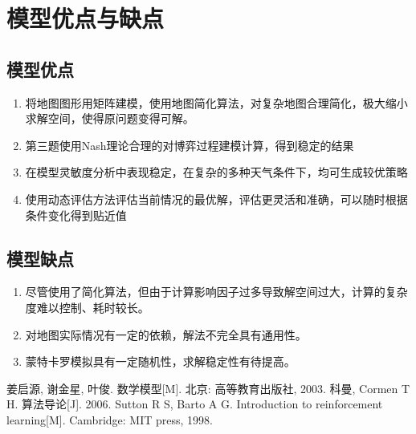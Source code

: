 \documentclass[withoutpre]{cumcmthesis} %
\begin{document}
\section{模型优点与缺点}
\subsection{模型优点}
\begin{enumerate}
    \item 将地图图形用矩阵建模，使用地图简化算法，对复杂地图合理简化，极大缩小求解空间，使得原问题变得可解。
    \item 第三题使用Nash理论合理的对博弈过程建模计算，得到稳定的结果
    \item 在模型灵敏度分析中表现稳定，在复杂的多种天气条件下，均可生成较优策略
    \item 使用动态评估方法评估当前情况的最优解，评估更灵活和准确，可以随时根据条件变化得到贴近值
\end{enumerate}

\subsection{模型缺点}
\begin{enumerate}
    \item 尽管使用了简化算法，但由于计算影响因子过多导致解空间过大，计算的复杂度难以控制、耗时较长。
    \item 对地图实际情况有一定的依赖，解法不完全具有通用性。
    \item 蒙特卡罗模拟具有一定随机性，求解稳定性有待提高。
\end{enumerate}



\begin{thebibliography}{9}%
     姜启源, 谢金星, 叶俊. 数学模型[M]. 北京: 高等教育出版社, 2003.
     科曼, Cormen T H. 算法导论[J]. 2006.
     Sutton R S, Barto A G. Introduction to reinforcement learning[M]. Cambridge: MIT press, 1998.

\end{thebibliography}
\end{document}
